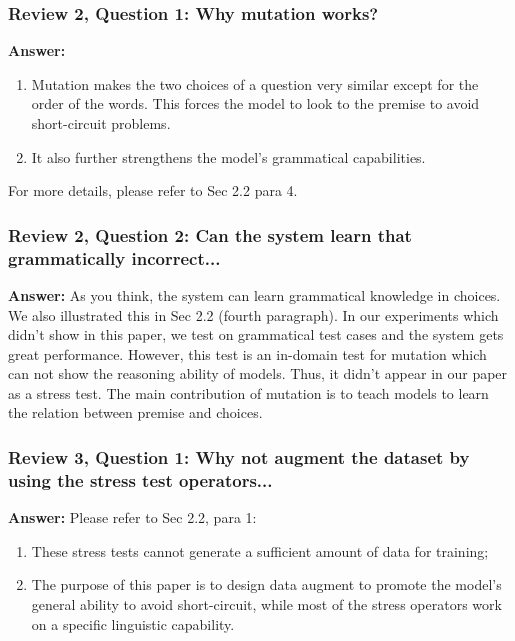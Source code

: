 \documentclass{article}
\begin{document}
\subsubsection*{Review 2, Question 1: Why mutation works?}

\textbf{Answer:} 
\begin{enumerate}
\item Mutation makes the two choices of a question very similar except for 
the order of the words. This forces the model to look to the premise to avoid
short-circuit problems. 
\item It also further strengthens the model's grammatical capabilities.
\end{enumerate}
For more details, please refer to Sec 2.2 para 4.
%
%
\subsubsection*{Review 2, Question 2: Can the system learn that grammatically incorrect...}

\textbf{Answer:} As you think, the system can learn grammatical knowledge in choices. 
We also illustrated this in Sec 2.2 (fourth paragraph). 
In our experiments which didn't show in this paper, we test on grammatical test cases and 
the system gets great performance. However, this test is an in-domain test for mutation which can not 
show the reasoning ability of models. Thus, it didn't appear in our paper as a stress test. 
The main contribution of mutation is to teach models to learn the relation between premise and choices. 

\subsubsection*{Review 3, Question 1: Why not augment the dataset by using the stress test operators...}

\textbf{Answer:} 
Please refer to Sec 2.2, para 1:
\begin{enumerate}
\item These stress tests cannot generate a sufficient amount of data for
training;
\item The purpose of this paper is to design data augment to promote
the model's general ability to avoid short-circuit, while most of the stress
operators work on a specific linguistic capability. 
\end{enumerate}
\end{document}

